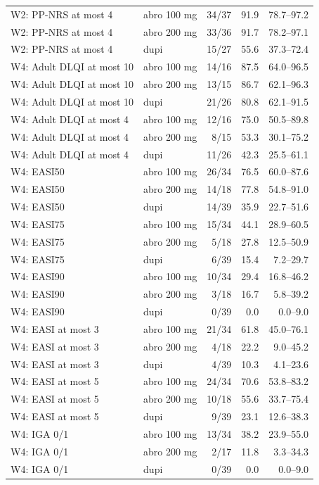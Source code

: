 \begin{longtable}{llrrr}
W2: PP-NRS at most 4 & abro 100 mg & 34/37 & 91.9 & 78.7--97.2 \\
W2: PP-NRS at most 4 & abro 200 mg & 33/36 & 91.7 & 78.2--97.1 \\
W2: PP-NRS at most 4 & dupi & 15/27 & 55.6 & 37.3--72.4 \\
W4: Adult DLQI at most 10 & abro 100 mg & 14/16 & 87.5 & 64.0--96.5 \\
W4: Adult DLQI at most 10 & abro 200 mg & 13/15 & 86.7 & 62.1--96.3 \\
W4: Adult DLQI at most 10 & dupi & 21/26 & 80.8 & 62.1--91.5 \\
W4: Adult DLQI at most 4 & abro 100 mg & 12/16 & 75.0 & 50.5--89.8 \\
W4: Adult DLQI at most 4 & abro 200 mg & 8/15 & 53.3 & 30.1--75.2 \\
W4: Adult DLQI at most 4 & dupi & 11/26 & 42.3 & 25.5--61.1 \\
W4: EASI50 & abro 100 mg & 26/34 & 76.5 & 60.0--87.6 \\
W4: EASI50 & abro 200 mg & 14/18 & 77.8 & 54.8--91.0 \\
W4: EASI50 & dupi & 14/39 & 35.9 & 22.7--51.6 \\
W4: EASI75 & abro 100 mg & 15/34 & 44.1 & 28.9--60.5 \\
W4: EASI75 & abro 200 mg & 5/18 & 27.8 & 12.5--50.9 \\
W4: EASI75 & dupi & 6/39 & 15.4 & 7.2--29.7 \\
W4: EASI90 & abro 100 mg & 10/34 & 29.4 & 16.8--46.2 \\
W4: EASI90 & abro 200 mg & 3/18 & 16.7 & 5.8--39.2 \\
W4: EASI90 & dupi & 0/39 & 0.0 & 0.0--9.0 \\
W4: EASI at most 3 & abro 100 mg & 21/34 & 61.8 & 45.0--76.1 \\
W4: EASI at most 3 & abro 200 mg & 4/18 & 22.2 & 9.0--45.2 \\
W4: EASI at most 3 & dupi & 4/39 & 10.3 & 4.1--23.6 \\
W4: EASI at most 5 & abro 100 mg & 24/34 & 70.6 & 53.8--83.2 \\
W4: EASI at most 5 & abro 200 mg & 10/18 & 55.6 & 33.7--75.4 \\
W4: EASI at most 5 & dupi & 9/39 & 23.1 & 12.6--38.3 \\
W4: IGA 0/1 & abro 100 mg & 13/34 & 38.2 & 23.9--55.0 \\
W4: IGA 0/1 & abro 200 mg & 2/17 & 11.8 & 3.3--34.3 \\
W4: IGA 0/1 & dupi & 0/39 & 0.0 & 0.0--9.0 \\

\end{longtable}
